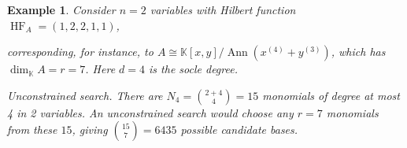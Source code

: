 \documentclass[a4paper,11p]{amsart}
\newtheorem{example0}[defn0]{Example}
\newenvironment{example}{ \begin{example0}\rm}{\end{example0}}
\newcommand{\K}{\mathbb K}
\begin{document}
\begin{example}

Consider $n=2$ variables with Hilbert function 
$\operatorname{HF}_A = (1,2,2,1,1)$,

corresponding, for instance, to $A \cong \K[x,y]/\operatorname{Ann}(x^{(4)}+y^{(3)})$, which has $\dim_\K A = r = 7$.  
Here $d = 4$ is the socle degree.

\emph{Unconstrained search.}
There are $N_4 = \binom{2+4}{4} = 15$ monomials of degree at most 4 in 2 variables.  
An unconstrained search would choose any $r=7$ monomials from these $15$, giving
$\binom{15}{7} = 6435$ possible candidate bases.


\end{example}
\end{document}
